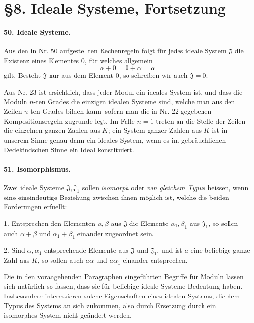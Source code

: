 \documentclass[11pt]{article}
\begin{document}
\section*{\S 8. Ideale Systeme, Fortsetzung}

\paragraph{50. Ideale Systeme.}
Aus den in Nr. 50 aufgestellten Rechenregeln folgt für jedes ideale System $\mathfrak J$ die Existenz eines Elementes $0$, für welches allgemein
\[
  \alpha+0=0+\alpha=\alpha
\]
gilt. Besteht $\mathfrak J$ nur aus dem Element $0$, so schreiben wir auch $\mathfrak J=0$.

Aus Nr. 23 ist ersichtlich, dass jeder Modul ein ideales System ist, und dass die Moduln $n$-ten Grades die einzigen idealen Systeme sind, welche man aus den Zeilen $n$-ten Grades bilden kann, sofern man die in Nr. 22 gegebenen Kompositionsregeln zugrunde legt. Im Falle $n=1$ treten an die Stelle der Zeilen die einzelnen ganzen Zahlen aus $K$; ein System ganzer Zahlen aus $K$ ist in unserem Sinne genau dann ein ideales System, wenn es im gebräuchlichen Dedekindschen Sinne ein Ideal konstituiert.

\paragraph{51. Isomorphismus.}
Zwei ideale Systeme $\mathfrak J,\mathfrak J_1$ sollen \emph{isomorph} oder \emph{von gleichem Typus} heissen, wenn eine eineindeutige Beziehung zwischen ihnen möglich ist, welche die beiden Forderungen erfuellt:

1. Entsprechen den Elementen $\alpha,\beta$ aus $\mathfrak J$ die Elemente $\alpha_1,\beta_1$ aus $\mathfrak J_1$, so sollen auch $\alpha+\beta$ und $\alpha_1+\beta_1$ einander zugeordnet sein.

2. Sind $\alpha,\alpha_1$ entsprechende Elemente aus $\mathfrak J$ und $\mathfrak J_1$, und ist $a$ eine beliebige ganze Zahl aus $K$, so sollen auch $a\alpha$ und $a\alpha_1$ einander entsprechen.

Die in den vorangehenden Paragraphen eingeführten Begriffe für Moduln lassen sich natürlich so fassen, dass sie für beliebige ideale Systeme Bedeutung haben. Insbesondere interessieren solche Eigenschaften eines idealen Systems, die dem Typus des Systems an sich zukommen, also durch Ersetzung durch ein isomorphes System nicht geändert werden.
\end{document}
